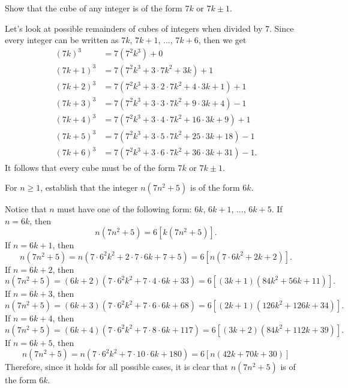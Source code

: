 \begin{exercise}
    Show that the cube of any integer is of the form $7k$ or $7k \pm 1$. \\
\end{exercise}

\begin{solution}
    Let's look at possible remainders of cubes of integers when divided by 7. Since every integer can be written as $7k$, $7k + 1$, ..., $7k+6$, then we get
    \begin{align*}
        (7k)^3 &= 7(7^2k^3) + 0\\
        (7k+1)^3 &= 7(7^2k^3 + 3 \cdot 7k^2 + 3k) + 1\\
        (7k+2)^3 &= 7(7^2k^3 + 3 \cdot 2 \cdot 7k^2 + 4 \cdot 3k + 1) + 1\\
        (7k+3)^3 &= 7(7^2k^3 + 3 \cdot 3 \cdot 7k^2 + 9 \cdot 3k + 4) -1 \\
        (7k+4)^3 &= 7(7^2k^3 + 3 \cdot 4 \cdot 7k^2 + 16 \cdot 3k + 9) + 1\\
        (7k+5)^3 &= 7(7^2k^3 + 3 \cdot 5 \cdot 7k^2 + 25 \cdot 3k + 18) - 1\\
        (7k+6)^3 &= 7(7^2k^3 + 3 \cdot 6 \cdot 7k^2 + 36 \cdot 3k + 31) - 1.
    \end{align*}
    It follows that every cube must be of the form $7k$ or $7k \pm 1$. \\
\end{solution}

\begin{exercise}
    For $n \geq 1$, establish that the integer $n(7n^2 + 5)$ is of the form $6k$.\\
\end{exercise}

\begin{solution}
    Notice that $n$ must have one of the following form: $6k$, $6k + 1$, ..., $6k + 5$. If $n = 6k$, then 
    $$n(7n^2 + 5) = 6[k(7n^2 + 5)].$$
    If $n = 6k + 1$, then
    $$n(7n^2 + 5) = n(7\cdot 6^2 k^2 + 2 \cdot 7\cdot 6k + 7 + 5) = 6[n(7\cdot 6k^2 + 2k + 2)].$$
    If $n = 6k + 2$, then 
    $$n(7n^2 + 5) = (6k+2)(7\cdot 6^2 k^2 + 7\cdot 4 \cdot 6k + 33) = 6[(3k+1)(84k^2+56k+11)].$$
    If $n = 6k + 3$, then
    $$n(7n^2 + 5) = (6k+3)(7\cdot 6^2 k^2 + 7\cdot 6 \cdot 6k + 68) = 6[(2k+1)(126k^2 + 126k + 34)].$$
    If $n = 6k + 4$, then
    $$n(7n^2 + 5) = (6k+4)(7\cdot 6^2k^2 + 7\cdot 8 \cdot 6k + 117) = 6[(3k+2)(84k^2 + 112k + 39)].$$
    If $n = 6k+5$, then 
    $$n(7n^2 + 5) = n(7\cdot 6^2 k^2 + 7\cdot 10 \cdot 6k + 180) = 6[n(42k + 70k + 30)]$$
    Therefore, since it holds for all possible cases, it is clear that $n(7n^2 + 5)$ is of the form $6k$. \\
\end{solution}

